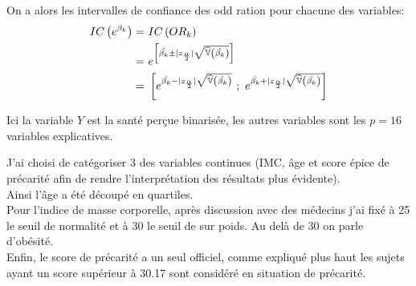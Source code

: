 \documentclass{book}
\begin{document}
\bigskip

\noindent
On a alors les intervalles de confiance des odd ration pour chacune des variables:\\
\begin{align*}
IC \left( e^{\beta_k} \right)  =& ~ IC \left( OR_k \right) \\
= & ~ e^{\left[ \hat{\beta_k} \pm |z_{{\alpha} \over {2}}| \sqrt{\widehat{\mathbb{V}}\left( \hat{\beta_k} \right)} \right]} \\
= & ~
 \left[
e^{\hat{\beta_k} - |z_{{\alpha} \over {2}}| \sqrt{\widehat{\mathbb{V}}\left( \hat{\beta_k} \right)}} 
~;~ 
e^{\hat{\beta_k} + |z_{{\alpha} \over {2}}| \sqrt{\widehat{\mathbb{V}}\left( \hat{\beta_k} \right)}} 
\right]
\end{align*}

\bigskip
\noindent
Ici la variable $Y$ est la santé perçue binarisée, les autres variables sont les $p = 16 $ variables explicatives.

\bigskip

\noindent
J'ai choisi de catégoriser 3 des variables continues (IMC, âge et score épice de précarité afin de rendre l'interprétation des résultats plus évidente).\\
Ainsi l'âge a été découpé en quartiles.\\
Pour l'indice de masse corporelle, après discussion avec des médecins j'ai fixé à 25 le seuil de normalité et à 30 le seuil de sur poids. Au delà de 30 on parle d'obésité.\\
Enfin, le score de précarité a un seul officiel, comme expliqué plus haut les sujets ayant un score supérieur à 30.17 sont considéré en situation de précarité.\\


\newpage
\end{document}
